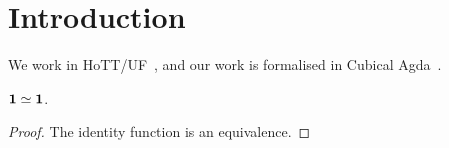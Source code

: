 
\section{Introduction}
\label{sec:introduction}

We work in HoTT/UF~\cite{univalentfoundationsprogramHomotopyTypeTheory2013},
and our work is formalised in Cubical Agda~\cite{vezzosiCubicalAgdaDependently2019}.

\begin{lemmarep}
  \label{lem:sample}
  ${\mathbf{1}} \simeq {\mathbf{1}}$.
\end{lemmarep}
\begin{proof}
  The identity function is an equivalence.
\end{proof}
